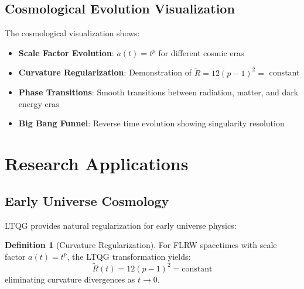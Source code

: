 \documentclass[11pt,a4paper]{article}
\theoremstyle{definition}
\newtheorem{definition}[theorem]{Definition}
\theoremstyle{remark}
\begin{document}
\subsection{Cosmological Evolution Visualization}

The cosmological visualization shows:

\begin{itemize}
\item \textbf{Scale Factor Evolution}: $a(t) = t^p$ for different cosmic eras
\item \textbf{Curvature Regularization}: Demonstration of $\tilde{R} = 12(p-1)^2 =$ constant
\item \textbf{Phase Transitions}: Smooth transitions between radiation, matter, and dark energy eras
\item \textbf{Big Bang Funnel}: Reverse time evolution showing singularity resolution
\end{itemize}

\section{Research Applications}

\subsection{Early Universe Cosmology}

LTQG provides natural regularization for early universe physics:

\begin{definition}[Curvature Regularization]
For FLRW spacetimes with scale factor $a(t) = t^p$, the LTQG transformation yields:
\begin{equation}
\tilde{R}(t) = 12(p-1)^2 = \text{constant}
\end{equation}
eliminating curvature divergences as $t \to 0$.
\end{definition}
\end{document}
